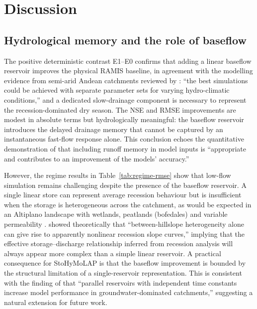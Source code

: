 \documentclass[a4paper,fleqn]{cas-sc}
\begin{document}
\section{Discussion}\label{sec:discussion}

\subsection{Hydrological memory and the role of baseflow}
\label{subsec:discussion-baseflow}

The positive deterministic contrast E1--E0 confirms that adding a
linear baseflow reservoir improves the physical RAMIS baseline, in
agreement with the modelling evidence from semi-arid Andean catchments
reviewed by \citet{nauditt2017}: ``the best simulations could be
achieved with separate parameter sets for varying hydro-climatic
conditions,'' and a dedicated slow-drainage component is necessary to
represent the recession-dominated dry season. The NSE and RMSE
improvements are modest in absolute terms but hydrologically
meaningful: the baseflow reservoir introduces the delayed drainage
memory that cannot be captured by an instantaneous fast-flow response
alone. This conclusion echoes the quantitative demonstration of
\citet{adnan2021comparison} that including runoff memory in model
inputs is ``appropriate and contributes to an improvement of the models'
accuracy.''

However, the regime results in Table~\ref{tab:regime-rmse} show that
low-flow simulation remains challenging despite the presence of the
baseflow reservoir. A single linear store can represent average
recession behaviour but is insufficient when the storage is
heterogeneous across the catchment, as would be expected in an
Altiplano landscape with wetlands, peatlands (bofedales) and variable
permeability \citep{harman2009}. \citet{harman2009} showed
theoretically that ``between-hillslope heterogeneity alone can give
rise to apparently nonlinear recession slope curves,'' implying that
the effective storage--discharge relationship inferred from recession
analysis will always appear more complex than a simple linear
reservoir. A practical consequence for StoHyMoLAP is that the
baseflow improvement is bounded by the structural limitation of a
single-reservoir representation. This is consistent with the finding
of \citet{van2013} that ``parallel reservoirs with independent time
constants increase model performance in groundwater-dominated
catchments,'' suggesting a natural extension for future work.
\end{document}
